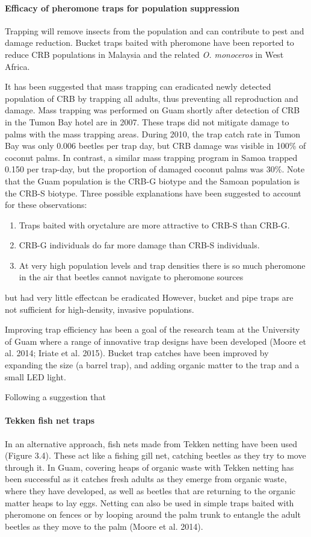 \documentclass[twocolumn,letterpaper]{scrartcl}
\begin{document}
\paragraph{Efficacy of pheromone traps for population suppression} Trapping will remove insects from the population and can contribute to pest and damage reduction. Bucket traps baited with pheromone have been reported to reduce CRB populations in Malaysia and the related \textit{O. monoceros} in West Africa. 

It has been suggested that mass trapping can eradicated newly detected population of CRB by trapping all adults, thus preventing all reproduction and damage. Mass trapping was performed on Guam shortly after detection of CRB in the Tumon Bay hotel are in 2007. These traps did not mitigate damage to palms with the mass trapping areas. During 2010, the trap catch rate in Tumon Bay was only 0.006 beetles per trap day, but CRB damage was visible in 100\% of coconut palms. In contrast, a similar mass trapping program in Samoa trapped 0.150 per trap-day, but the proportion of damaged coconut palms was 30\%. Note that the Guam population is the CRB-G biotype and the Samoan population is the CRB-S biotype. Three possible explanations have been suggested to account for these observations:
\begin{enumerate}
	\item Traps baited with oryctalure are more attractive to CRB-S than CRB-G.
	\item CRB-G individuals do far more damage than CRB-S individuals.
	\item At very high population levels and trap densities there is so much pheromone in the air that beetles cannot navigate to pheromone sources
\end{enumerate} 


but had very little effectcan be eradicated  However, bucket and pipe traps are not 
sufficient for high-density, invasive populations. 

Improving trap efficiency has been a goal of the research team at the University of Guam where a range of 
innovative trap designs have been developed (Moore et al. 2014; Iriate et al. 2015). Bucket trap catches have 
been improved by expanding the size (a barrel trap), and adding organic matter to the trap and a small LED 
light. 

Following a suggestion that 

\paragraph{Tekken fish net traps} In an alternative approach, fish nets made from Tekken netting have been used (Figure 3.4). These act like 
a fishing gill net, catching beetles as they try to move through it. In Guam, covering heaps of organic waste with 
Tekken netting has been successful as it catches fresh adults as they emerge from organic waste, where they 
have developed, as well as beetles that are returning to the organic matter heaps to lay eggs. Netting can also 
be used in simple traps baited with pheromone on fences or by looping around the palm trunk to entangle the 
adult beetles as they move to the palm (Moore et al. 2014).
\end{document}
